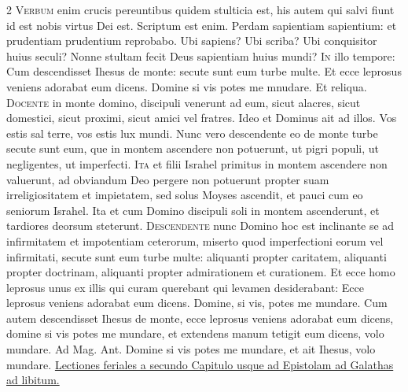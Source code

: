 \begin{multicols*}{2}
\lettrine[lines=2]{\zallmancaps \color{Red} V}{erbum} enim crucis pereuntibus quidem stulticia est, his autem qui salvi fiunt id est nobis virtus Dei est. Scriptum est enim. Perdam sapientiam sapientium: et prudentiam prudentium reprobabo. Ubi sapiens? Ubi scriba? Ubi conquisitor huius seculi? Nonne stultam fecit Deus sapientiam huius mundi?
\lettrine[lines=2]{\zallmancaps \color{Blue} I}{n} illo tempore: Cum descendisset Ihesus de monte: secute sunt eum turbe multe. Et ecce leprosus veniens adorabat eum dicens. Domine si vis potes me mnudare. Et reliqua.
\lettrine[lines=2]{\zallmancaps \color{Red} D}{ocente} in monte domino, discipuli venerunt ad eum, sicut alacres, sicut domestici, sicut proximi, sicut amici vel fratres. Ideo et Dominus ait ad illos. Vos estis sal terre, vos estis lux mundi. Nunc vero descendente eo de monte turbe secute sunt eum, que in montem ascendere non potuerunt, ut pigri populi, ut negligentes, ut imperfecti.
\lettrine[lines=2]{\zallmancaps \color{Red} I}{ta} et filii Israhel primitus in montem ascendere non valuerunt, ad obviandum Deo pergere non potuerunt propter suam irreligiositatem et impietatem, sed solus Moyses ascendit, et pauci cum eo seniorum Israhel. Ita et cum Domino discipuli soli in montem ascenderunt, et tardiores deorsum steterunt.
\lettrine[lines=2]{\zallmancaps \color{Blue} D}{escendente} nunc Domino hoc est inclinante se ad infirmitatem et impotentiam ceterorum, miserto quod imperfectioni eorum vel infirmitati, secute sunt eum turbe multe: aliquanti propter caritatem, aliquanti propter doctrinam, aliquanti propter admirationem et curationem. Et ecce homo leprosus unus ex illis qui curam querebant qui levamen desiderabant: Ecce leprosus veniens adorabat eum dicens. Domine, si vis, potes me mundare.
 Cum autem descendisset Ihesus de monte, ecce leprosus veniens adorabat eum dicens, domine si vis potes me mundare, et extendens manum tetigit eum dicens, volo mundare. {\color{Red} Ad Mag. Ant.} Domine si vis potes me mundare, et ait Ihesus, volo mundare.
\newline \ul{Lectiones feriales a secundo Capitulo usque ad Epistolam ad Galathas ad libitum.}

\end{multicols*}
